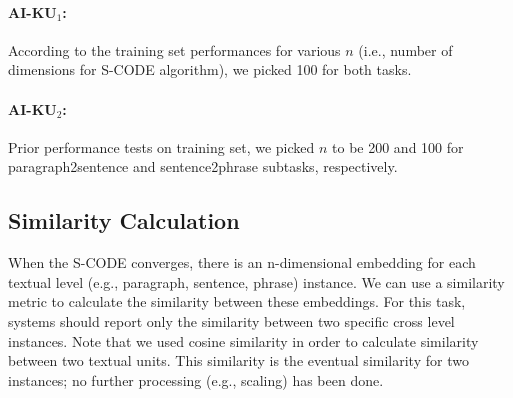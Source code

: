 \documentclass[11pt]{article}
\begin{document}
\paragraph{AI-KU$_1$:} According to the training set performances for various $n$ (i.e., number of dimensions for S-CODE algorithm), we picked 100 for both tasks.

\paragraph{AI-KU$_2$:} Prior performance tests on training set, we picked $n$ to be 200 and 100 for paragraph2sentence and sentence2phrase subtasks, respectively.

\subsection{Similarity Calculation}

When the S-CODE converges, there is an n-dimensional embedding for each textual level (e.g., paragraph, sentence, phrase) instance. We can use a similarity metric to calculate 
the similarity between these embeddings. For this task, systems should report only the similarity between two specific cross level instances. Note that we used cosine similarity in order to calculate similarity between two textual units. This similarity is the eventual similarity for two instances; no further processing (e.g., scaling) has been done.

\end{document}
